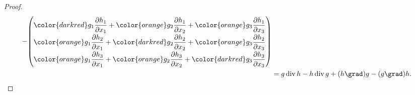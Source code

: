 \begin{proof}
\begin{align*}
-
{\renewcommand{\arraystretch}{1.9}
\begin{pmatrix}
\displaystyle
{\color{darkred}
g_1\frac{\partial h_1}{\partial x_1}
}
+
{\color{orange}
g_2\frac{\partial h_1}{\partial x_2}
}
+
{\color{orange}
g_3\frac{\partial h_1}{\partial x_3}
}
\\
\displaystyle
{\color{orange}
g_1\frac{\partial h_2}{\partial x_1}
}
+
{\color{darkred}
g_2\frac{\partial h_2}{\partial x_2}
}
+
{\color{orange}
g_3\frac{\partial h_2}{\partial x_3}
}
\\
\displaystyle
{\color{orange}
g_1\frac{\partial h_3}{\partial x_1}
}
+
{\color{orange}
g_2\frac{\partial h_3}{\partial x_2}
}
+
{\color{darkred}
g_3\frac{\partial h_3}{\partial x_3}
}
\end{pmatrix}}
\\
&=
g\operatorname{div}h
-
h\operatorname{div}g
+
(h\grad)g
-
(g\grad)h.
\qedhere
\end{align*}
\end{proof}

%

